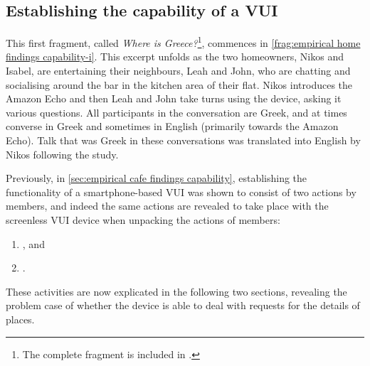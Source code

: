 \subsection{Establishing the capability of a VUI}\label{sec:empirical home findings capability}
\begin{revisedsubmission}
This first fragment, called \textit{Where is Greece?}\footnote{The complete fragment is included in .}, commences in \autoref{frag:empirical home findings capability-i}.
This excerpt unfolds as the two homeowners, Nikos and Isabel, are entertaining their neighbours, Leah and John, who are chatting and socialising around the bar in the kitchen area of their flat.
Nikos introduces the Amazon Echo and then Leah and John take turns using the device, asking it various questions.
All participants in the conversation are Greek, and at times converse in Greek and sometimes in English (primarily towards the Amazon Echo).
Talk that was Greek in these conversations was translated into English by Nikos following the study.

Previously, in \ref{sec:empirical cafe findings capability}, establishing the functionality of a smartphone-based \ac{VUI} was shown to consist of two actions by members, and indeed the same actions are revealed to take place with the screenless \ac{VUI} device when unpacking the actions of members:
\begin{enumerate}[label=(\roman*)]
\item {}, and
\item {}.
\end{enumerate}

These activities are now explicated in the following two sections, revealing the problem case of whether the device is able to deal with requests for the details of places.
\end{revisedsubmission}






